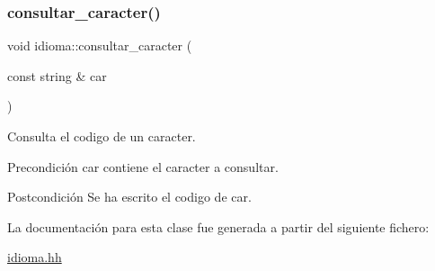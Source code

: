 \subsubsection{\texorpdfstring{consultar\+\_\+caracter()}{consultar\_caracter()}}
{\footnotesize\ttfamily void idioma\+::consultar\+\_\+caracter (\begin{DoxyParamCaption}\item[{const string \&}]{car }\end{DoxyParamCaption})}



Consulta el codigo de un caracter. 

\begin{DoxyPrecond}{Precondición}
car contiene el caracter a consultar. 
\end{DoxyPrecond}
\begin{DoxyPostcond}{Postcondición}
Se ha escrito el codigo de car. 
\end{DoxyPostcond}


La documentación para esta clase fue generada a partir del siguiente fichero\+:\begin{DoxyCompactItemize}
\item 
\hyperlink{idioma_8hh}{idioma.\+hh}\end{DoxyCompactItemize}
